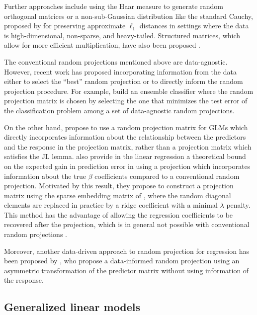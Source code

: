 \documentclass[
  article]{jss}
\begin{document}
Further approaches include using the Haar measure to generate random
orthogonal matrices \citep{cannings2017random} or a non-sub-Gaussian
distribution like the standard Cauchy, proposed by
\citet{LiHastie2006VerySparseRP} for preserving approximate \(\ell_1\)
distances in settings where the data is high-dimensional, non-sparse,
and heavy-tailed. Structured matrices, which allow for more efficient
multiplication, have also been proposed \citep[see
e.g.,][]{ailon2009fast, Clarkson2013LowRankApprox}.

The conventional random projections mentioned above are data-agnostic.
However, recent work has proposed incorporating information from the
data either to select the ``best'' random projection or to directly
inform the random projection procedure. For example,
\citet{cannings2017random} build an ensemble classifier where the random
projection matrix is chosen by selecting the one that minimizes the test
error of the classification problem among a set of data-agnostic random
projections.

On the other hand, \citet{parzer2024glms} propose to use a random
projection matrix for GLMs which directly incorporates information about
the relationship between the predictors and the response in the
projection matrix, rather than a projection matrix which satisfies the
JL lemma. \citet{parzer2024sparse} also provide in the linear regression
a theoretical bound on the expected gain in prediction error in using a
projection which incorporates information about the true \(\beta\)
coefficients compared to a conventional random projection. Motivated by
this result, they propose to construct a projection matrix using the
sparse embedding matrix of \citet{Clarkson2013LowRankApprox}, where the
random diagonal elements are replaced in practice by a ridge coefficient
with a minimal \(\lambda\) penalty. This method has the advantage of
allowing the regression coefficients to be recovered after the
projection, which is in general not possible with conventional random
projections \citep{Thanei2017RPforHDR}.

Moreover, another data-driven approach to random projection for
regression has been proposed by \citet{ryder2019asymmetric}, who propose
a data-informed random projection using an asymmetric transformation of
the predictor matrix without using information of the response.

\subsection{Generalized linear models}\label{generalized-linear-models}
\end{document}
